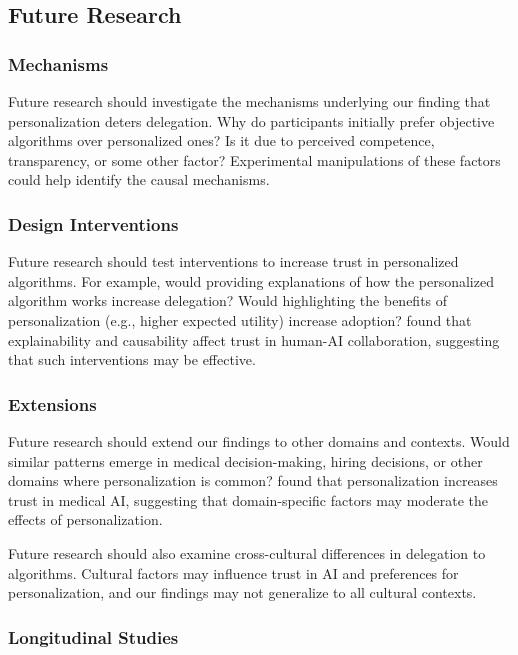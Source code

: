 \subsection{Future Research}

\subsubsection{Mechanisms}

Future research should investigate the mechanisms underlying our finding that personalization deters delegation. Why do participants initially prefer objective algorithms over personalized ones? Is it due to perceived competence, transparency, or some other factor? Experimental manipulations of these factors could help identify the causal mechanisms.

\subsubsection{Design Interventions}

Future research should test interventions to increase trust in personalized algorithms. For example, would providing explanations of how the personalized algorithm works increase delegation? Would highlighting the benefits of personalization (e.g., higher expected utility) increase adoption? \citet{shin2021} found that explainability and causability affect trust in human-AI collaboration, suggesting that such interventions may be effective.

\subsubsection{Extensions}

Future research should extend our findings to other domains and contexts. Would similar patterns emerge in medical decision-making, hiring decisions, or other domains where personalization is common? \citet{longoni2019} found that personalization increases trust in medical AI, suggesting that domain-specific factors may moderate the effects of personalization.

Future research should also examine cross-cultural differences in delegation to algorithms. Cultural factors may influence trust in AI and preferences for personalization, and our findings may not generalize to all cultural contexts.

\subsubsection{Longitudinal Studies}


